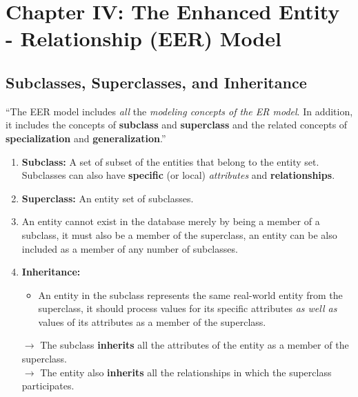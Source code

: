 \documentclass[10pt]{article}
\newcommand{\quotes}[1]{``#1''}
\newcommand{\tf}{\textbf}
\newcommand{\ti}{\textit}
\begin{document}
\section{Chapter IV: The Enhanced Entity - Relationship (EER) Model}

\subsection{Subclasses, Superclasses, and Inheritance}

\quotes{The EER model includes \ti{all} the \ti{modeling concepts of the ER model}. In addition, it includes the concepts of \tf{subclass} and \tf{superclass} and the related concepts of \tf{specialization} and \tf{generalization}.}

\begin{enumerate}
	\item \tf{Subclass:} A set of subset of the entities that belong to the entity set. Subclasses can also have \tf{specific} (or local) \ti{attributes} and \tf{relationships}.
	\item \tf{Superclass:} An entity set of subclasses.
	\item An entity cannot exist in the database merely by being a member of a subclass, it must also be a member of the superclass, an entity can be also included as a member of any number of subclasses.
	\item \tf{Inheritance: }
	\begin{itemize}
		\item An entity in the subclass represents the same real-world entity from the superclass, it should process values for its specific attributes \ti{as well as} values of its attributes as a member of the superclass.
	\end{itemize}
	$\rightarrow$ The subclass \tf{inherits} all the attributes of the entity as a member of the superclass. \\
	$\rightarrow$ The entity also \tf{inherits} all the relationships in which the superclass participates.
\end{enumerate}
\end{document}
